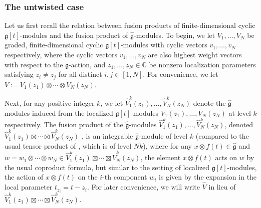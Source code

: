 \documentclass[pdftex]{sigma}
\numberwithin{equation}{section}
\begin{document}
\subsubsection{The untwisted case}\label{Section 3.1.1}

Let us first recall the relation between fusion products of finite-dimensional cyclic $\mathfrak{g}[t]$-modules and the fusion product of $\widehat{\mathfrak{g}}$-modules. To begin, we let $V_1,\dots,V_N$ be graded, finite-dimensional cyclic $\mathfrak{g}[t]$-modules with cyclic vectors $v_1,\dots,v_N$ respectively, where the cyclic vectors $v_1,\dots,v_N$ are also highest weight vectors with respect to the $\mathfrak{g}$-action, and $z_1,\dots,z_N\in \mathbb{C}$ be nonzero localization parameters satisfying $z_i\neq z_j$ for all distinct $i,j\in[1,N]$. For convenience, we let~${V:=V_1(z_1)\otimes\cdots\otimes V_N(z_N)}$.

Next, for any positive integer $k$, we let $\widehat{V}_1^k(z_1),\dots,\widehat{V}_N^k(z_N)$ denote the $\widehat{\mathfrak{g}}$-modules induced from the localized $\mathfrak{g}[t]$-modules $V_1(z_1),\dots,V_N(z_N)$ at level $k$ respectively. The fusion product of the $\widehat{\mathfrak{g}}$-modules $\widehat{V}_1^k(z_1),\dots ,\widehat{V}_N^k(z_N)$, denoted $\widehat{V}_1^k(z_1)\boxtimes \cdots\boxtimes\widehat{V}_N^k(z_N)$ \cite{FJKLM04}, is an integrable $\widehat{\mathfrak{g}}$-module of level $k$ (compared to the usual tensor product  of , which is of level $Nk$), where for any $x\otimes f(t)\in \widehat{\mathfrak{g}}$ and
$
w=w_1\otimes\cdots\otimes w_N\in\widehat{V}_1^k(z_1)\boxtimes\cdots\boxtimes\widehat{V}_N^k(z_N)$,
 the element $x\otimes f(t)$ acts on $w$ by the usual coproduct formula, but similar to the setting of localized $\mathfrak{g}[t]$-modules, the action of $x\otimes f(t)$ on the $i$-th component $w_i$ is given by the expansion in the local parameter $t_{z_i}=t-z_i$. For later convenience, we will write $\widehat{V}$ in lieu of~${\widehat{V}_1^k(z_1) \boxtimes\cdots\boxtimes\widehat{V}_N^k(z_N)}$.
\end{document}
